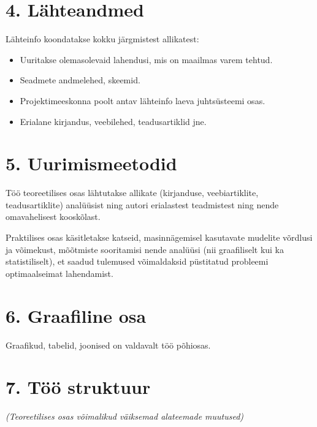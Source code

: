 \section*{4. Lähteandmed}

Lähteinfo koondatakse kokku järgmistest allikatest:

\begin{itemize}
  \item Uuritakse olemasolevaid lahendusi, mis on maailmas varem tehtud.
  \item Seadmete andmelehed, skeemid.
  \item Projektimeeskonna poolt antav lähteinfo laeva juhtsüsteemi osas.
  \item Erialane kirjandus, veebilehed, teadusartiklid jne.
\end{itemize}

\section*{5. Uurimismeetodid}

Töö teoreetilises osas lähtutakse allikate (kirjanduse, veebiartiklite, teadusartiklite) analüüsist ning autori erialastest teadmistest ning nende omavahelisest kooskõlast.

Praktilises osas käsitletakse katseid, masinnägemisel kasutavate mudelite võrdlusi ja võimekust, mõõtmiste sooritamisi nende analüüsi (nii graafiliselt kui ka statistiliselt), et saadud tulemused võimaldaksid püstitatud probleemi optimaalseimat lahendamist.

\section*{6. Graafiline osa}

Graafikud, tabelid, joonised on valdavalt töö põhiosas.

\section*{7. Töö struktuur}

\textit{(Teoreetilises osas võimalikud väiksemad alateemade muutused)}

